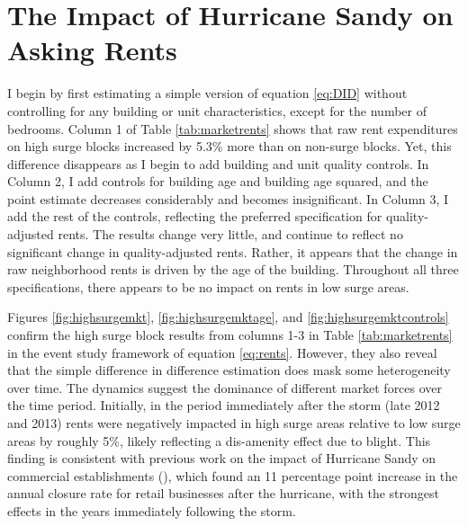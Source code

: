 \documentclass[12pt]{article}
\begin{document}
{{{{%
 

\section{The Impact of Hurricane Sandy on Asking Rents}{\label{sec:Results}

I begin by first estimating a simple version of equation \ref{eq:DID} without controlling for any building or unit characteristics, except for the number of bedrooms.  Column 1 of Table \ref{tab:marketrents} shows that raw rent expenditures on high surge blocks increased by 5.3\% more than on non-surge blocks. Yet, this difference disappears as I begin to add building and unit quality controls. In Column 2, I add controls for building age and building age squared, and the point estimate decreases considerably and becomes insignificant.  In Column 3, I add the rest of the controls, reflecting the preferred specification for quality-adjusted rents.  The results change very little, and continue to reflect no significant change in quality-adjusted rents. Rather, it appears that the change in raw neighborhood rents is driven by the age of the building.  Throughout all three specifications, there appears to be no impact on rents in low surge areas.

Figures \ref{fig:highsurgemkt}, \ref{fig:highsurgemktage}, and \ref{fig:highsurgemktcontrols} confirm the high surge block results from columns 1-3 in Table \ref{tab:marketrents} in the event study framework of equation \ref{eq:rents}.  However, they also reveal that the simple difference in difference estimation does mask some heterogeneity over time.  The dynamics suggest the dominance of different market forces over the time period.  Initially, in the period immediately after the storm (late 2012 and 2013) rents were negatively impacted in high surge areas relative to low surge areas by roughly 5\%, likely reflecting a dis-amenity effect due to blight.  This finding is consistent with previous work on the impact of Hurricane Sandy on commercial establishments (\cite{meltzer_localized_2021}), which found an 11 percentage point increase in the annual closure rate for retail businesses after the hurricane, with the strongest effects in the years immediately following the storm.   

}}}}}
\end{document}
